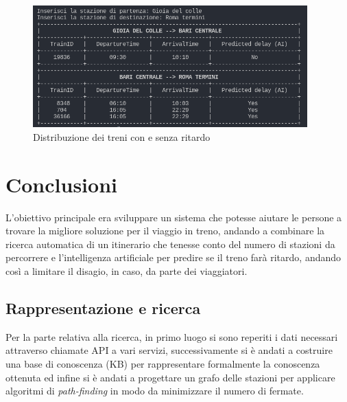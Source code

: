 \documentclass[italian,12pt,a4paper]{article}
\begin{document}
		\begin{figure}[!h]
			\centering
			\includegraphics[width=400px]{img/search_itin}
			\caption{Distribuzione dei treni con e senza ritardo}
		\end{figure}
		
	\section{Conclusioni}
	
	L'obiettivo principale era sviluppare un sistema che potesse aiutare le persone a trovare la migliore soluzione per il viaggio in treno, andando a combinare la ricerca automatica di un itinerario che tenesse conto del numero di stazioni da percorrere e l'intelligenza artificiale per predire se il treno farà ritardo, andando così a limitare il disagio, in caso, da parte dei viaggiatori. \\
	\subsection{Rappresentazione e ricerca}
	Per la parte relativa alla ricerca, in primo luogo si sono reperiti i dati necessari attraverso chiamate API a vari servizi, successivamente si è andati a costruire una base di conoscenza (KB) per rappresentare formalmente la conoscenza ottenuta ed infine si è andati a progettare un grafo delle stazioni per applicare algoritmi di \textit{path-finding} in modo da minimizzare il numero di fermate.
\end{document}
